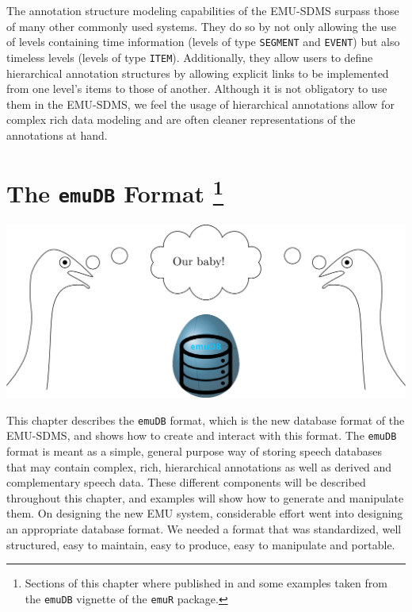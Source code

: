 \documentclass[]{book}
\let\rmarkdownfootnote\footnote%
\def\footnote{\protect\rmarkdownfootnote}
\begin{document}
The annotation structure modeling capabilities of the EMU-SDMS surpass those of many other commonly used systems. They do so by not only allowing the use of levels containing time information (levels of type \texttt{SEGMENT} and \texttt{EVENT}) but also timeless levels (levels of type \texttt{ITEM}). Additionally, they allow users to define hierarchical annotation structures by allowing explicit links to be implemented from one level's items to those of another. Although it is not obligatory to use them in the EMU-SDMS, we feel the usage of hierarchical annotations allow for complex rich data modeling and are often cleaner representations of the annotations at hand.

\hypertarget{chap:emuDB}{%
\chapter[The \texttt{emuDB} Format ]{\texorpdfstring{The \texttt{emuDB} Format \footnote{Sections of this chapter where published in \citet{winkelmann:2017aa} and some examples taken from the \texttt{emuDB} vignette of the \texttt{emuR} package.}}{The emuDB Format }}\label{chap:emuDB}}

\begin{center}\includegraphics[width=0.75\linewidth]{pics/EMU-webAppEmu_emuDB} \end{center}

This chapter describes the \texttt{emuDB} format, which is the new database format of the EMU-SDMS, and shows how to create and interact with this format. The \texttt{emuDB} format is meant as a simple, general purpose way of storing speech databases that may contain complex, rich, hierarchical annotations as well as derived and complementary speech data. These different components will be described throughout this chapter, and examples will show how to generate and manipulate them. On designing the new EMU system, considerable effort went into designing an appropriate database format. We needed a format that was standardized, well structured, easy to maintain, easy to produce, easy to manipulate and portable.
\end{document}

